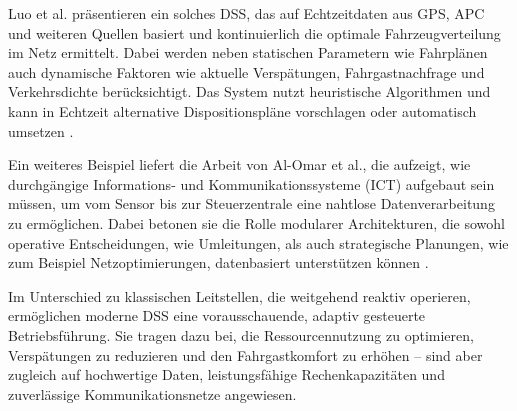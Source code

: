 Luo et al. präsentieren ein solches DSS, das auf Echtzeitdaten aus GPS, APC und weiteren Quellen basiert und kontinuierlich die optimale Fahrzeugverteilung im Netz ermittelt. Dabei werden neben statischen Parametern wie Fahrplänen auch dynamische Faktoren wie aktuelle Verspätungen, Fahrgastnachfrage und Verkehrsdichte berücksichtigt. Das System nutzt heuristische Algorithmen und kann in Echtzeit alternative Dispositionspläne vorschlagen oder automatisch umsetzen \cite{Luo2019}.

Ein weiteres Beispiel liefert die Arbeit von Al-Omar et al., die aufzeigt, wie durchgängige Informations- und Kommunikationssysteme (ICT) aufgebaut sein müssen, um vom Sensor bis zur Steuerzentrale eine nahtlose Datenverarbeitung zu ermöglichen. Dabei betonen sie die Rolle modularer Architekturen, die sowohl operative Entscheidungen, wie Umleitungen, als auch strategische Planungen, wie zum Beispiel Netzoptimierungen, datenbasiert unterstützen können \cite{AlOmar2012}.

Im Unterschied zu klassischen Leitstellen, die weitgehend reaktiv operieren, ermöglichen moderne DSS eine vorausschauende, adaptiv gesteuerte Betriebsführung. Sie tragen dazu bei, die Ressourcennutzung zu optimieren, Verspätungen zu reduzieren und den Fahrgastkomfort zu erhöhen – sind aber zugleich auf hochwertige Daten, leistungsfähige Rechenkapazitäten und zuverlässige Kommunikationsnetze angewiesen.

